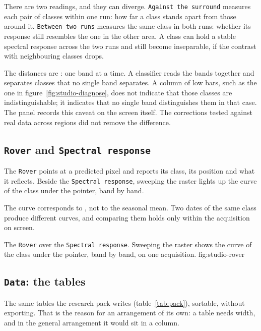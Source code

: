 \documentclass[12pt,a4paper]{article}
\begin{document}
There are two readings, and they can diverge. \texttt{Against the surround}
measures each pair of classes within one run: how far a class stands apart from
those around it. \texttt{Between two runs} measures the same class in both
runs: whether its response still resembles the one in the other area. A class
can hold a stable spectral response across the two runs and still become
inseparable, if the contrast with neighbouring classes drops.

\begin{objecao}
The distances are : one band at a time. A classifier reads the
bands together and separates classes that no single band separates. A column of
low bars, such as the one in figure~\ref{fig:studio-diagnose}, does not indicate
that those classes are indistinguishable; it indicates that no single band
distinguishes them in that case. The panel records this caveat on the screen
itself. The corrections tested against real data across regions did not remove
the difference.
\end{objecao}

\subsection{\texttt{Rover} and \texttt{Spectral response}}

The \texttt{Rover} points at a predicted pixel and reports its class, its
position and what it reflects. Beside the \texttt{Spectral response}, sweeping
the raster lights up the curve of the class under the pointer, band by band.

\begin{objecao}
The curve corresponds to , not to the seasonal mean. Two
dates of the same class produce different curves, and comparing them holds only
within the acquisition on screen.
\end{objecao}

  {The \texttt{Rover} over the \texttt{Spectral response}. Sweeping the raster
   shows the curve of the class under the pointer, band by band, on one
   acquisition.}
  {fig:studio-rover}

\subsection{\texttt{Data}: the tables}

The same tables the research pack writes (table~\ref{tab:pack}), sortable,
without exporting. That is the reason for an arrangement of its own: a table
needs width, and in the general arrangement it would sit in a column.
\end{document}
